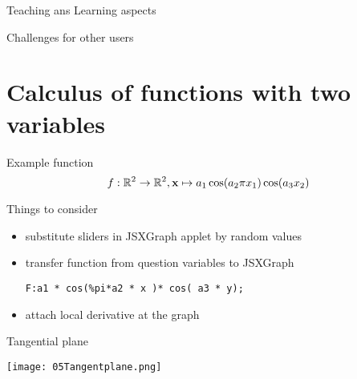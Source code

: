\begin{frame}[t]{Teaching ans Learning aspects}
\end{frame}

\begin{frame} [t]{Challenges for other users}

\end{frame}
\section{Calculus of functions with two variables}
\begin{frame} [t]{}
\begin{block}{Example function}
\[f:\mathbb{R}^2\to\mathbb{R}^2, \mathbf{x}\mapsto  a_1  \cos(a_2\pi x_1 )\cos( a_3x_2)\]
\end{block}

\begin{block}{Things to consider}
\begin{itemize}
\item substitute sliders in JSXGraph applet by random values
\item transfer function from question variables to JSXGraph
\centerline{\texttt{F:a1 * cos(\%pi*a2 * x )* cos( a3 * y);}}
\item attach local derivative at the graph
\end{itemize}
\end{block}
\end{frame}
\begin{frame} [t]{Tangential plane}
\begin{center}
\texttt{[image: 05Tangentplane.png]}
\end{center}
\end{frame}

